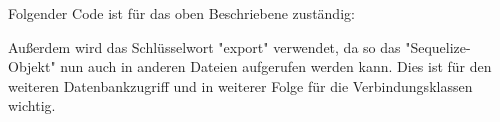 Folgender Code ist für das oben Beschriebene zuständig:


Außerdem wird das Schlüsselwort "export" verwendet, da so das "Sequelize-Objekt" nun auch in anderen Dateien aufgerufen werden kann. Dies ist für den weiteren Datenbankzugriff und in weiterer Folge für die Verbindungsklassen wichtig.


\pagebreak




